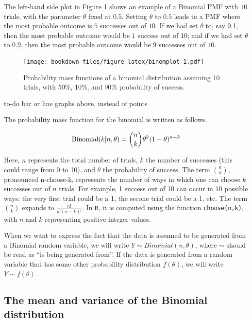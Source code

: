 \documentclass[12pt,]{krantz}
\theoremstyle{definition}
\theoremstyle{definition}
\theoremstyle{definition}
\theoremstyle{remark}
\let\BeginKnitrBlock\begin \let\EndKnitrBlock\end
\begin{document}
The left-hand side plot in Figure \ref{fig:binomplot} shows an example of a Binomial PMF with \(10\) trials, with the parameter \(\theta\) fixed at \(0.5\). Setting \(\theta\) to \(0.5\) leads to a PMF where the most probable outcome is \(5\) successes out of \(10\). If we had set \(\theta\) to, say 0.1, then the most probable outcome would be \(1\) success out of \(10\); and if we had set \(\theta\) to \(0.9\), then the most probable outcome would be \(9\) successes out of \(10\).

\begin{figure}
\centering
\texttt{[image: bookdown\_files/figure-latex/binomplot-1.pdf]}
\caption{\label{fig:binomplot}Probability mass functions of a binomial distribution assuming 10 trials, with 50\%, 10\%, and 90\% probability of success.}
\end{figure}

\BeginKnitrBlock{rmdnote}
to-do bar or line graphs above, instead of points
\EndKnitrBlock{rmdnote}

The probability mass function for the binomial is written as follows.

\begin{equation}
\hbox{Binomial}(k|n,\theta) = 
\binom{n}{k} \theta^{k} (1-\theta)^{n-k}
\end{equation}

Here, \(n\) represents the total number of trials, \(k\) the number of successes (this could range from 0 to 10), and \(\theta\) the probability of success. The term \(\binom{n}{k}\), pronounced n-choose-k, represents the number of ways in which one can choose \(k\) successes out of \(n\) trials. For example, 1 success out of 10 can occur in 10 possible ways: the very first trial could be a 1, the secone trial could be a 1, etc.
The term \(\binom{n}{k}\) expands to \(\frac{n!}{k!(n-k)!}\). In \texttt{R}, it is computed using the function \texttt{choose(n,k)}, with \(n\) and \(k\) representing positive integer values.

When we want to express the fact that the data is assumed to be generated from a Binomial random variable, we will write \(Y \sim Binomial(n,\theta)\), where \(\sim\) should be read as ``is being generated from''. If the data is generated from a random variable that has some other probability distribution \(f(\theta)\), we will write \(Y\sim f(\theta)\).

\hypertarget{the-mean-and-variance-of-the-binomial-distribution}{%
\subsection{The mean and variance of the Binomial distribution}\label{the-mean-and-variance-of-the-binomial-distribution}}
\end{document}

